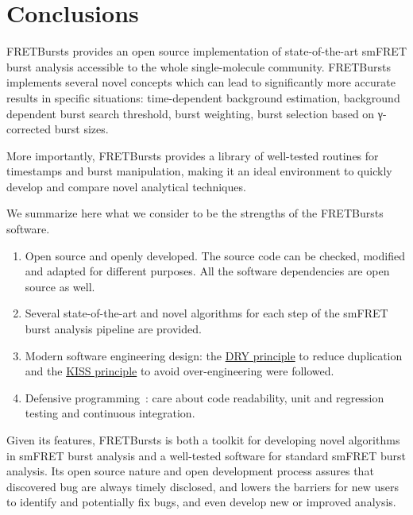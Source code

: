 \section{Conclusions}
\label{sec:conclusions}

FRETBursts provides an open source implementation of state-of-the-art smFRET burst analysis 
accessible to the whole single-molecule community.
FRETBursts implements several novel concepts which can lead 
to significantly more accurate results in specific situations:
time-dependent background estimation, background dependent burst search threshold,
burst weighting, burst selection based on γ-corrected burst sizes.

More importantly, FRETBursts provides a library of well-tested routines
for timestamps and burst manipulation, making it an ideal environment to 
quickly develop and compare novel analytical techniques.

We summarize here what we consider to be the strengths
of the FRETBursts software.

\begin{enumerate}
\item Open source and openly developed. The source code can be checked, modified and
adapted for different purposes. All the software dependencies are open source as well.
\item Several state-of-the-art and novel algorithms for each step of the
smFRET burst analysis pipeline are provided.
\item Modern software engineering design: the
\href{http://en.wikipedia.org/wiki/Don\%27t_repeat_yourself}{DRY principle}
to reduce duplication and the
\href{http://en.wikipedia.org/wiki/KISS_principle}{KISS principle}
to avoid over-engineering were followed.
\item Defensive programming~\cite{Prli__2012}: care about code readability,
unit and regression testing and continuous integration.
\end{enumerate}

Given its features, FRETBursts is both a toolkit for developing novel algorithms
in smFRET burst analysis and a well-tested software for standard smFRET burst analysis. 
Its open source nature and open development process assures that discovered bug 
are always timely disclosed, and lowers the barriers
for new users to identify and potentially fix bugs, and even develop new or improved analysis.


